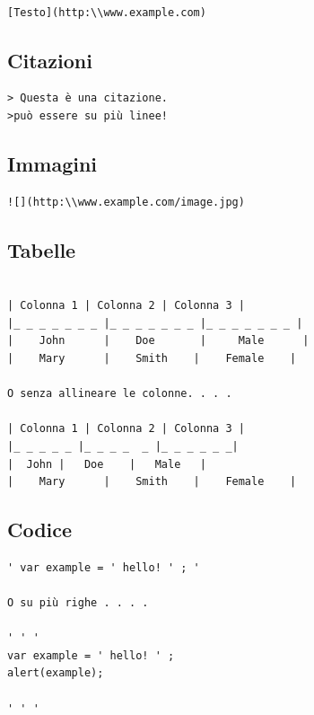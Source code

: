 \documentclass[12pt,a4paper]{article}
\begin{document}
\begin{verbatim}

[Testo](http:\\www.example.com)

\end{verbatim}

\subsection{Citazioni}

\begin{verbatim}
> Questa è una citazione.
>può essere su più linee!
\end{verbatim}

\subsection{Immagini}
\begin{verbatim}
![](http:\\www.example.com/image.jpg)
\end{verbatim}

\subsection{Tabelle}
\begin{verbatim}

| Colonna 1 | Colonna 2 | Colonna 3 |
|_ _ _ _ _ _ _ |_ _ _ _ _ _ _ |_ _ _ _ _ _ _ |
|    John      |    Doe       |     Male      |
|    Mary      |    Smith    |    Female    |

O senza allineare le colonne. . . . 

| Colonna 1 | Colonna 2 | Colonna 3 |
|_ _ _ _ _ |_ _ _ _  _ |_ _ _ _ _ _|
|  John |   Doe    |   Male   |
|    Mary      |    Smith    |    Female    |

\end{verbatim}
	
\subsection{Codice}
\begin{verbatim}
' var example = ' hello! ' ; '

O su più righe . . . .

' ' ' 
var example = ' hello! ' ; 
alert(example);

' ' '

\end{verbatim}
\end{document}
